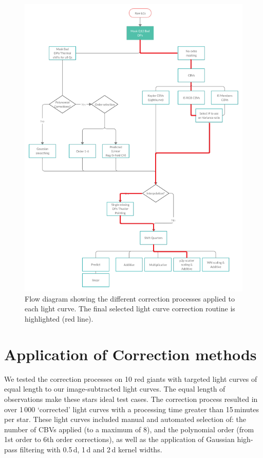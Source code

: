 \begin{figure}
    \centering
    \includegraphics[width=\linewidth]{Chapter5/correction_process.png}
    \caption[Correction process routines]{Flow diagram showing the different correction processes applied to each light curve. The final selected light curve correction routine is highlighted (red line).}
    \label{fig:correction_process}
\end{figure}

\section{Application of Correction methods}

We tested the correction processes on 10 red giants with targeted \Kepler{} light curves of equal length to our image-subtracted light curves. The equal length of observations make these stars ideal test cases. The correction process resulted in over 1\,000 `corrected' light curves with a processing time greater than 15\,minutes per star. These light curves included manual and automated selection of: the number of CBVs applied (to a maximum of 8), and the polynomial order (from 1st order to 6th order corrections), as well as the application of Gaussian high-pass filtering with 0.5\,d, 1\,d and 2\,d kernel widths.

